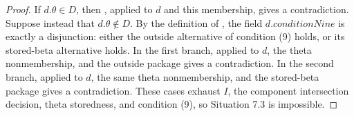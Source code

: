 \begin{proof}
If \(d.\theta\in D\), then
, applied
to \(d\) and this membership, gives a contradiction.  Suppose instead
that \(d.\theta\notin D\).  By the definition of
, the field
\(d.\mathit{conditionNine}\) is exactly a disjunction: either the outside
alternative of condition (9) holds, or its stored-beta alternative
holds.  In the first branch,
applied to \(d\), the theta nonmembership, and the outside package gives
a contradiction.  In the second branch,
applied to \(d\), the same theta nonmembership, and the stored-beta
package gives a contradiction.  These cases exhaust \(I\), the
component intersection decision, theta storedness, and condition (9), so
Situation 7.3 is impossible.
\end{proof}
